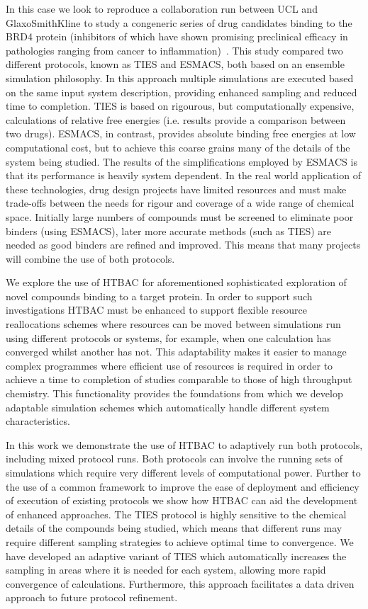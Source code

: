 In this case we look to reproduce a collaboration run between UCL and
GlaxoSmithKline to study a congeneric series of drug candidates binding to the
BRD4 protein (inhibitors of which have shown promising preclinical efficacy in
pathologies ranging from cancer to inflammation)~\cite{Wan2017brd4}. This
study compared two different protocols, known as TIES and ESMACS, both based
on an ensemble simulation philosophy. In this approach multiple simulations
are executed based on the same input system description, providing enhanced
sampling and reduced time to completion. TIES is based on rigourous, but
computationally expensive, calculations of relative free energies (i.e.
results provide a comparison between two drugs). ESMACS, in contrast, provides
absolute binding free energies at low computational cost, but to achieve this
coarse grains many of the details of the system being studied. The results of
the simplifications employed by ESMACS is that its performance is heavily
system dependent. In the real world application of these technologies, drug
design projects have limited resources and must make trade-offs between the
needs for rigour and coverage of a wide range of chemical space. Initially
large numbers of compounds must be screened to eliminate poor binders (using
ESMACS), later more accurate methods (such as TIES) are needed as good binders
are refined and improved. This means that many projects will combine the use
of both protocols.

We explore the use of HTBAC for aforementioned sophisticated
exploration of novel compounds binding to a target protein.
In order to support such investigations HTBAC must be enhanced to support
flexible resource reallocations schemes where resources can be moved between
simulations run using different protocols or systems, for example, when one
calculation has converged whilst another has not. This adaptability makes it
easier to manage complex programmes where efficient use of resources is
required in order to achieve a time to completion of studies comparable to
those of high throughput chemistry. This functionality provides the
foundations from which we develop adaptable simulation schemes which
automatically handle different system characteristics.

In this work we demonstrate the use of HTBAC to adaptively run both protocols,
including mixed protocol runs. Both protocols can involve the running sets of
simulations which require very different levels of computational power.
Further to the use of a common framework to improve the ease of deployment and
efficiency of execution of existing protocols we show how HTBAC can aid the
development of enhanced approaches. The TIES protocol is highly sensitive to
the chemical details of the compounds being studied, which means that
different runs may require different sampling strategies to achieve optimal
time to convergence. We have developed an adaptive variant of TIES which
automatically increases the sampling in areas where it is needed for each
system, allowing more rapid convergence of calculations. Furthermore, this
approach facilitates a data driven approach to future protocol refinement.

